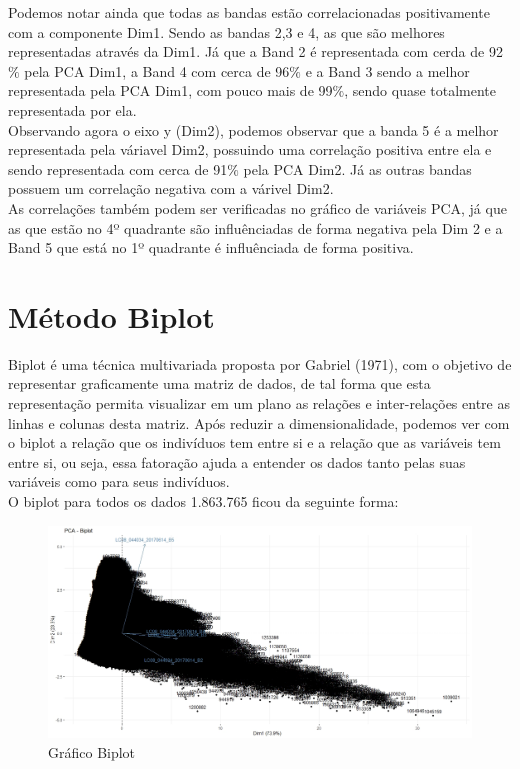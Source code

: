 \documentclass[a4paper,12pt]{article}
\begin{document}
Podemos notar ainda que todas as bandas estão correlacionadas positivamente com a componente Dim1. Sendo as bandas 2,3 e 4, as que são melhores representadas através da Dim1. Já que a Band 2 é representada com cerda de 92$\%$ pela PCA Dim1, a Band 4 com cerca de 96$\%$ e a Band 3 sendo a melhor representada pela PCA Dim1, com pouco mais de 99$\%$, sendo quase totalmente representada por ela.\\

Observando agora o eixo y (Dim2), podemos observar que a banda 5 é a melhor representada pela váriavel Dim2, possuindo uma correlação positiva entre ela e sendo representada com cerca de 91$\%$ pela PCA Dim2. Já as outras bandas possuem um correlação negativa com a várivel Dim2.\\

As correlações também podem ser verificadas no gráfico de variáveis PCA, já que as que estão no 4º quadrante são influênciadas de forma negativa pela Dim 2 e a Band 5 que está no 1º quadrante é influênciada de forma positiva.


\section{Método Biplot}

Biplot é uma técnica multivariada proposta por Gabriel (1971), com o objetivo de
representar graficamente uma matriz de dados, de tal forma que esta representação permita visualizar em um plano as relações e inter-relações entre as linhas e colunas desta matriz.  Após reduzir a dimensionalidade, podemos ver com o biplot a relação que os indivíduos tem entre si e a relação que as variáveis tem entre si, ou seja, essa fatoração ajuda a entender os dados tanto pelas suas variáveis como para seus indivíduos.\\

O biplot para todos os dados 1.863.765 ficou da seguinte forma:

\begin{center}
\begin{figure}[H]
    \centering
    \includegraphics[width = 0.9 \textwidth]{total.jpeg}
    \caption{Gráfico Biplot}
\end{figure}    
\end{center}
\end{document}
